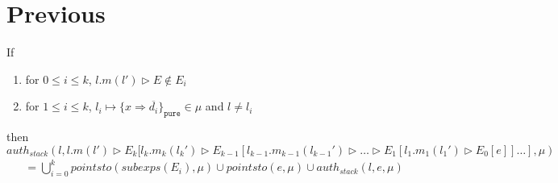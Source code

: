 \documentclass{llncs}
\newcommand{\keywadj}[1]{\mathtt{#1}}
\begin{document}
\newpage
\section{Previous}

\begin{mdframed}
\begin{lemma}
\label{l:four}
If
\begin{enumerate}
\item for $0 \leq i \leq k$, $l.m(l') \rhd E \not\in E_i$
\item for $1 \leq i \leq k$, $l_i \mapsto \{ x \Rightarrow \overline{d_i} \}_{\keywadj{pure}} \in \mu$ and $l \neq l_i$
\end{enumerate}
then
\noindent$auth_{stack}(l, l.m(l') \rhd E_k[l_k.m_k(l_k') \rhd E_{k-1}[l_{k-1}.m_{k-1}(l_{k-1}') \rhd \dots \rhd E_1[l_1.m_1(l_1') \rhd E_0[e]] \dots ], \mu)$
\vspace{-7pt}
\begin{align*}
&= \bigcup^k_{i = 0} pointsto(subexps(E_i), \mu) \cup pointsto(e, \mu) \cup auth_{stack}(l, e, \mu)
\end{align*}
\end{lemma}
\end{mdframed}
\end{document}
